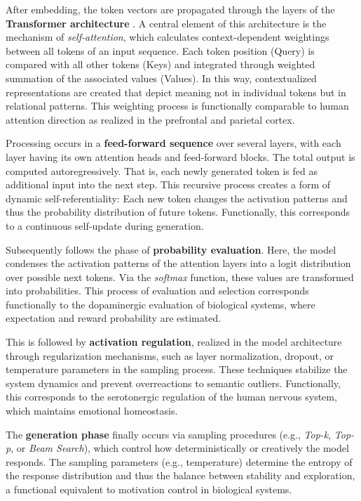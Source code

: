 After embedding, the token vectors are propagated through the layers of the \textbf{Transformer architecture} \cite{Vaswani2017}. A central element of this architecture is the mechanism of \emph{self-attention}, which calculates context-dependent weightings between all tokens of an input sequence. Each token position (Query) is compared with all other tokens (Keys) and integrated through weighted summation of the associated values (Values). In this way, contextualized representations are created that depict meaning not in individual tokens but in relational patterns. This weighting process is functionally comparable to human attention direction as realized in the prefrontal and parietal cortex.

Processing occurs in a \textbf{feed-forward sequence} over several layers, with each layer having its own attention heads and feed-forward blocks. The total output is computed autoregressively. That is, each newly generated token is fed as additional input into the next step. This recursive process creates a form of dynamic self-referentiality: Each new token changes the activation patterns and thus the probability distribution of future tokens. Functionally, this corresponds to a continuous self-update during generation.

Subsequently follows the phase of \textbf{probability evaluation}. Here, the model condenses the activation patterns of the attention layers into a logit distribution over possible next tokens. Via the \emph{softmax} function, these values are transformed into probabilities. This process of evaluation and selection corresponds functionally to the dopaminergic evaluation of biological systems, where expectation and reward probability are estimated.

This is followed by \textbf{activation regulation}, realized in the model architecture through regularization mechanisms, such as layer normalization, dropout, or temperature parameters in the sampling process. These techniques stabilize the system dynamics and prevent overreactions to semantic outliers. Functionally, this corresponds to the serotonergic regulation of the human nervous system, which maintains emotional homeostasis.

The \textbf{generation phase} finally occurs via sampling procedures (e.g., \emph{Top-k}, \emph{Top-p}, or \emph{Beam Search}), which control how deterministically or creatively the model responds. The sampling parameters (e.g., temperature) determine the entropy of the response distribution and thus the balance between stability and exploration, a functional equivalent to motivation control in biological systems.

